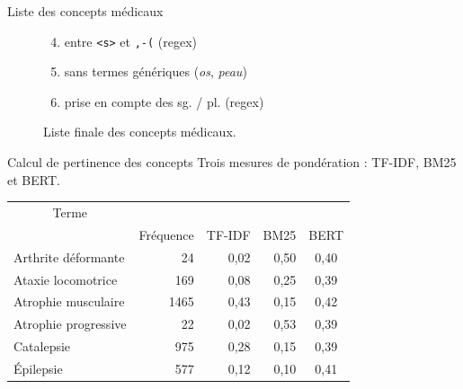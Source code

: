 \begin{frame}{Liste des concepts médicaux}
\begin{figure}[!htb]
\begin{minipage}{.5\textwidth}
        \caption{Liste finale des concepts médicaux.}
        \label{fig:prob1_6_2}
    \end{minipage}%
    \begin{minipage}{.6\textwidth}
        \centering
   \begin{enumerate}
   \setcounter{enumi}{3}
   \item entre \texttt{<s>} et \texttt{,-(} (regex)
   \item sans termes génériques (\textit{os}, \textit{peau})
\item prise en compte des sg. / pl. (regex)
   \end{enumerate}
    \end{minipage}
\end{figure}
\end{frame}

\begin{frame}{Calcul de pertinence des concepts}
Trois mesures de pondération : \textsc{TF-IDF}, \textsc{BM25} et \textsc{BERT}.
    \footnotesize
\begin{table}[]
\begin{tabular}{|l|cccc|}
\hline
\multicolumn{1}{|c|}{\multirow{}{}{Terme}} & \multicolumn{4}{c|}{\cellcolor{gray!10!white}{ Corpus \og{}Autres\fg{}}}                              \\ \cline{2-5} 
\multicolumn{1}{|c|}{}                       & \multicolumn{1}{c}{{Fréquence}} & \multicolumn{1}{c}{{TF-IDF}} & \multicolumn{1}{c}{{BM25}}  & {BERT} \\ \hline
{Arthrite déformante} &
  \multicolumn{1}{|r|}{{24}} &
  \multicolumn{1}{|r|}{{0,02}} &
  \multicolumn{1}{|r|}{{0,50}} &
  {0,40} \\ \hline
{Ataxie locomotrice} &
  \multicolumn{1}{|r|}{{169}} &
  \multicolumn{1}{|r|}{{0,08}} &
  \multicolumn{1}{|r|}{{0,25}} &
  {0,39} \\ \hline
{Atrophie musculaire} &
  \multicolumn{1}{|r|}{{1465}} &
  \multicolumn{1}{|r|}{{0,43}} &
  \multicolumn{1}{|r|}{{0,15}} &
  {0,42} \\ \hline
{Atrophie progressive} &
  \multicolumn{1}{|r|}{{22}} &
  \multicolumn{1}{|r|}{{0,02}} &
  \multicolumn{1}{|r|}{{0,53}} &
  {0,39} \\ \hline
{Catalepsie} &
  \multicolumn{1}{|r|}{{975}} &
  \multicolumn{1}{|r|}{{0,28}} &
  \multicolumn{1}{|r|}{{0,15}} &
  {0,39} \\ \hline
{Épilepsie} &
  \multicolumn{1}{|r|}{{577}} &
  \multicolumn{1}{|r|}{{0,12}} &
  \multicolumn{1}{|r|}{{0,10}} &
  {0,41} \\ \hline

\end{tabular}
\end{table}
\end{frame}
